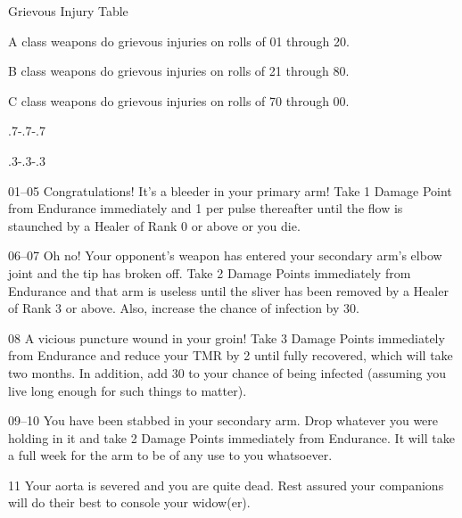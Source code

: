 \begin{Chapter}{Grievous Injury Table}
\label{table:grievous}
\begin{Enumerate}
\item A class weapons do grievous injuries on rolls of 01 through 20.  
\item B class weapons do grievous injuries on rolls of 21 through 80.  
\item C class weapons do grievous injuries on rolls of 70 through 00.
\end{Enumerate}

\smallskip

\makeatletter
\patchcmd{\@item}
  {\addvspace\itemsep}
  {\par\kern\dimexpr.7\itemsep-.7\parskip-.7\baselineskip\relax%
   \hrulefill%
   \par\kern\dimexpr.3\itemsep-.3\parskip-.3\baselineskip\relax}
  {}{}%
\makeatother
  
\begin{Description}
\item[01–05] Congratulations! It’s a bleeder in your primary arm! Take
  1 Damage Point from Endurance immediately and 1 per pulse thereafter
  until the flow is staunched by a Healer of Rank 0 or above or you
  die.

\item[06–07] Oh no! Your opponent’s weapon has entered your secondary
  arm’s elbow joint and the tip has broken off. Take 2 Damage Points
  immediately from Endurance and that arm is useless until the sliver
  has been removed by a Healer of Rank 3 or above. Also, increase the
  chance of infection by 30.

\item[08] A vicious puncture wound in your groin!  Take 3 Damage
  Points immediately from Endurance and reduce your TMR by 2 until
  fully recovered, which will take two months. In addition, add 30 to
  your chance of being infected (assuming you live long enough for
  such things to matter).

\item[09–10] You have been stabbed in your secondary arm. Drop
  whatever you were holding in it and take 2 Damage Points immediately
  from Endurance. It will take a full week for the arm to be of any
  use to you whatsoever.

\item[11] Your aorta is severed and you are quite dead. Rest assured
  your companions will do their best to console your widow(er).


\end{Description}
\end{Chapter}
